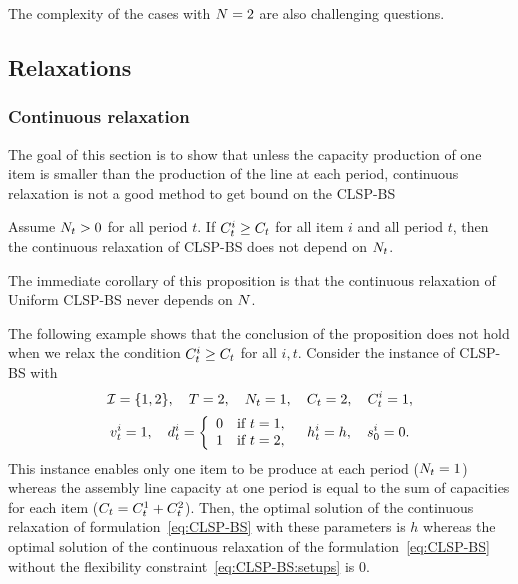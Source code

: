 The complexity of the cases with $N=2$ are also challenging questions.




\subsection{Relaxations}
\label{sec:PDP:deterministic:theoretical-results:continuous-relaxation}

\subsubsection{Continuous relaxation}

The goal of this section is to show that unless the capacity production of one item is smaller than the production of the line at each period, continuous relaxation is not a good method to get bound on the CLSP-BS



\begin{prop}\label{prop:relaxation-independant-N}
Assume $N_t>0$ for all period $t$.
If $C_t^i\ge C_t$ for all item $i$ and all period $t$, then the continuous relaxation of CLSP-BS does not depend on $N_t$.
\end{prop}

The immediate corollary of this proposition is that the continuous relaxation of Uniform CLSP-BS never depends on $N$.


The following example shows that the conclusion of the proposition does not hold when we relax the condition $C_t^i\ge C_t$ for all $i,t$.
Consider the instance of CLSP-BS with
$$
  \REF=\crbracket{1,2}
  ,\quad
  \horizon=2
  ,\quad
  \nbsetups_t=1
  ,\quad
  \capacity_t=2
  ,\quad
  \capacity_t^i=1
  ,
$$
$$  \rate_t^i=1
  ,\quad
  \demand_t^i
  =\left\{
  \begin{array}{ll}
  0 & \mbox{if}\ t=1,
  \\
  1 & \mbox{if}\ t=2,\end{array}
  \right.
  \quad
  \holding_t^i=\holding
  ,\quad
  \inventory_0^i=0.
$$
This instance enables only one item to be produce at each period ($N_t=1$) whereas the assembly line capacity at one period is equal to the sum of capacities for each item ($C_t=C_t^1+C_t^2$).
Then, the optimal solution of the continuous relaxation of formulation~\eqref{eq:CLSP-BS} with these parameters is $h$ whereas the optimal solution of the continuous relaxation of the formulation~\eqref{eq:CLSP-BS} without the flexibility constraint~\eqref{eq:CLSP-BS:setups} is 0.


